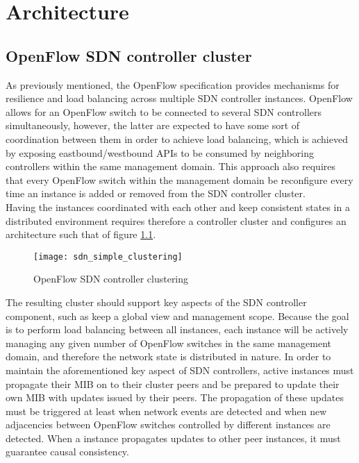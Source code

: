 
\chapter{Architecture}
\label{chapter:architecture}
\section{OpenFlow SDN controller cluster}
\label{section:SDN-controller-cluster}
As previously mentioned, the OpenFlow specification provides mechanisms for resilience and load balancing across multiple \gls{SDN} controller instances.
OpenFlow allows for an OpenFlow switch to be connected to several \gls{SDN} controllers simultaneously, however, the latter are expected to have some sort of coordination between them in order to achieve load balancing, which is achieved by exposing eastbound/westbound \glspl{API} to be consumed by neighboring controllers within the same management domain.
This approach also requires that every OpenFlow switch within the management domain be reconfigure every time an instance is added or removed from the \gls{SDN} controller cluster.\\
%
Having the instances coordinated with each other and keep consistent states in a distributed environment requires therefore a controller cluster and configures an architecture such that of figure \ref{fig:sdn_simple_clustering}.\\
%
\begin{figure}
	\centering
	\texttt{[image: sdn\_simple\_clustering]}
	\caption{OpenFlow SDN controller clustering}
	\label{fig:sdn_simple_clustering}
\end{figure}
%
The resulting cluster should support key aspects of the \gls{SDN} controller component, such as keep a global view and management scope.
Because the goal is to perform load balancing between all instances, each instance will be actively managing any given number of OpenFlow switches in the same management domain, and therefore the network state is distributed in nature.
In order to maintain the aforementioned key aspect of \gls{SDN} controllers, active instances must propagate their \gls{MIB} on to their cluster peers and be prepared to update their own \gls{MIB} with updates issued by their peers.
The propagation of these updates must be triggered at least when network events are detected and when new adjacencies between OpenFlow switches controlled by different instances are detected.
When a instance propagates updates to other peer instances, it must guarantee causal consistency.\\
%
